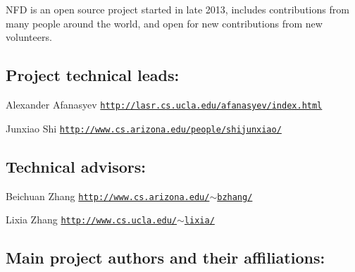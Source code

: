 N\+FD is an open source project started in late 2013, includes contributions from many people around the world, and open for new contributions from new volunteers.

\subsection*{Project technical leads\+:}


\begin{DoxyItemize}
\item Alexander Afanasyev \href{http://lasr.cs.ucla.edu/afanasyev/index.html}{\tt http\+://lasr.\+cs.\+ucla.\+edu/afanasyev/index.\+html}
\item Junxiao Shi \href{http://www.cs.arizona.edu/people/shijunxiao/}{\tt http\+://www.\+cs.\+arizona.\+edu/people/shijunxiao/}
\end{DoxyItemize}

\subsection*{Technical advisors\+:}


\begin{DoxyItemize}
\item Beichuan Zhang \href{http://www.cs.arizona.edu/~bzhang/}{\tt http\+://www.\+cs.\+arizona.\+edu/$\sim$bzhang/}
\item Lixia Zhang \href{http://www.cs.ucla.edu/~lixia/}{\tt http\+://www.\+cs.\+ucla.\+edu/$\sim$lixia/}
\end{DoxyItemize}

\subsection*{Main project authors and their affiliations\+:}


